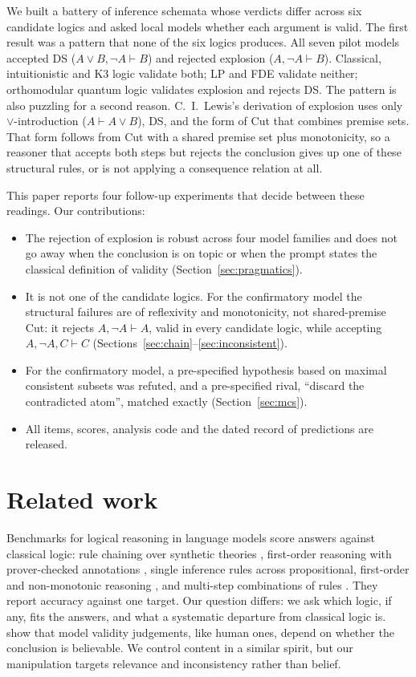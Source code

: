 \documentclass[11pt]{article}
\begin{document}
We built a battery of inference schemata whose verdicts differ across six candidate logics and asked
local models whether each argument is valid. The first result was a pattern that none of the six logics
produces. All seven pilot models accepted DS ($A \lor B, \neg A \vdash B$) and rejected explosion
($A, \neg A \vdash B$). Classical, intuitionistic and K3 logic validate both; LP and FDE validate
neither; orthomodular quantum logic validates explosion and rejects DS. The pattern is also puzzling for
a second reason. C.~I.~Lewis's derivation of explosion \citep{lewis1932} uses only $\lor$-introduction
($A \vdash A \lor B$), DS, and the form of Cut that combines premise sets. That form follows from Cut
with a shared premise set plus monotonicity, so a reasoner that accepts both steps but rejects the
conclusion gives up one of these structural rules, or is not applying a consequence relation at all.

This paper reports four follow-up experiments that decide between these readings. Our contributions:
\begin{itemize}
\item The rejection of explosion is robust across four model families and does not go away when the
conclusion is on topic or when the prompt states the classical definition of validity
(Section~\ref{sec:pragmatics}).
\item It is not one of the candidate logics. For the confirmatory model the structural failures are of
reflexivity and monotonicity, not shared-premise Cut: it rejects $A, \neg A \vdash A$, valid in every candidate logic,
while accepting $A, \neg A, C \vdash C$ (Sections~\ref{sec:chain}--\ref{sec:inconsistent}).
\item For the confirmatory model, a pre-specified hypothesis based on maximal consistent subsets was
refuted, and a pre-specified rival, ``discard the contradicted atom'', matched exactly
(Section~\ref{sec:mcs}).
\item All items, scores, analysis code and the dated record of predictions are released.
\end{itemize}

\section{Related work}

Benchmarks for logical reasoning in language models score answers against classical logic: rule
chaining over synthetic theories \citep{clark2020,saparov2023}, first-order reasoning with
prover-checked annotations \citep{han2024}, single inference rules across propositional, first-order and
non-monotonic reasoning \citep{parmar2024}, and multi-step combinations of rules \citep{patel2024}. They
report accuracy against one target. Our question differs: we ask which logic, if any, fits the
answers, and what a systematic departure from classical logic is.
\citet{lampinen2024} show that model validity judgements, like human ones, depend on whether the
conclusion is believable. We control content in a similar spirit, but our manipulation targets relevance
and inconsistency rather than belief.
\end{document}

